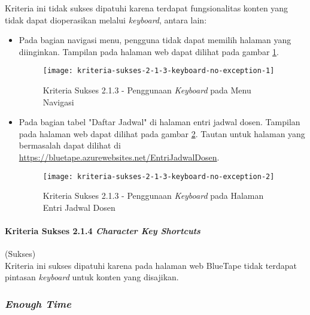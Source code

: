 Kriteria ini tidak sukses dipatuhi karena terdapat fungsionalitas konten yang tidak dapat dioperasikan melalui \textit{keyboard}, antara lain:

\begin{itemize}
    \item Pada bagian navigasi menu, pengguna tidak dapat memilih halaman yang diinginkan. Tampilan pada halaman web dapat dilihat pada gambar \ref{fig:2.1.3_keyboard_no_exception_1}.
    \begin{figure}[H]
        \centering  
        \texttt{[image: kriteria-sukses-2-1-3-keyboard-no-exception-1]}  
        \caption[Kriteria Sukses 2.1.3 - Penggunaan \textit{Keyboard} pada Menu Navigasi]{Kriteria Sukses 2.1.3 - Penggunaan \textit{Keyboard} pada Menu Navigasi}
        \label{fig:2.1.3_keyboard_no_exception_1}  
    \end{figure} 

    \item Pada bagian tabel "Daftar Jadwal" di halaman entri jadwal dosen. Tampilan pada halaman web dapat dilihat pada gambar \ref{fig:2.1.3_keyboard_no_exception_2}. Tautan untuk halaman yang bermasalah dapat dilihat di \url{https://bluetape.azurewebsites.net/EntriJadwalDosen}.
    \begin{figure}[H]
        \centering  
        \texttt{[image: kriteria-sukses-2-1-3-keyboard-no-exception-2]}  
        \caption[Kriteria Sukses 2.1.3 - Penggunaan \textit{Keyboard} pada Halaman Entri Jadwal Dosen]{Kriteria Sukses 2.1.3 - Penggunaan \textit{Keyboard} pada Halaman Entri Jadwal Dosen}
        \label{fig:2.1.3_keyboard_no_exception_2}  
    \end{figure} 
\end{itemize}

\paragraph{Kriteria Sukses 2.1.4 \textit{Character Key Shortcuts}}
\label{par:kepatuhan_bluetape_kriteria_sukses_2.1.4}
(Sukses)\\

Kriteria ini sukses dipatuhi karena pada halaman web BlueTape tidak terdapat pintasan \textit{keyboard} untuk konten yang disajikan.

\subsubsection{\textit{Enough Time}}
\label{subsubsec:kepatuhan_bluetape_enough_time}

